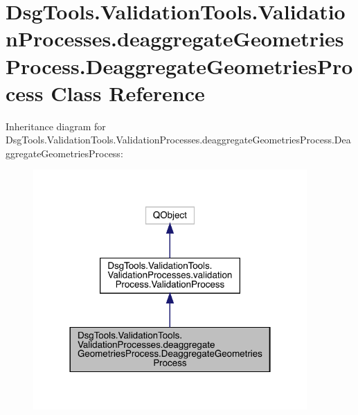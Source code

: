 \hypertarget{class_dsg_tools_1_1_validation_tools_1_1_validation_processes_1_1deaggregate_geometries_process_f80917ef3b04cd8dc841b918110d01db}{}\section{Dsg\+Tools.\+Validation\+Tools.\+Validation\+Processes.\+deaggregate\+Geometries\+Process.\+Deaggregate\+Geometries\+Process Class Reference}
\label{class_dsg_tools_1_1_validation_tools_1_1_validation_processes_1_1deaggregate_geometries_process_f80917ef3b04cd8dc841b918110d01db}


Inheritance diagram for Dsg\+Tools.\+Validation\+Tools.\+Validation\+Processes.\+deaggregate\+Geometries\+Process.\+Deaggregate\+Geometries\+Process\+:
\nopagebreak
\begin{figure}[H]
\begin{center}
\leavevmode
\includegraphics[width=296pt]{class_dsg_tools_1_1_validation_tools_1_1_validation_processes_1_1deaggregate_geometries_process_f3b86fb9c95a2f6e7ef92808b47d4463}
\end{center}
\end{figure}


